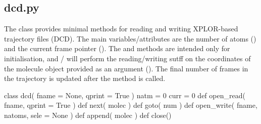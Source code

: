 \normalsize
\subsection[dcd]{dcd.py}
The class  provides
minimal methods for reading and writing XPLOR-based trajectory files (DCD). The main variables/attributes are
the number of atoms () and the current frame pointer ().
The  and  methods are intended
only for initialisation, and / will perform the reading/writing sutff on the coordinates
of the molecule object provided as an argument ().
The final number of frames in the trajectory is updated after the  method is called.\\
\begin{pyglist}[language=python,fvset={frame=single}]
class dcd( fname = None, qprint = True )
    natm = 0
	curr = 0
    def open_read( fname, qprint = True )
    def next( molec )
    def goto( num )
    def open_write( fname, natoms, sele = None )
    def append( molec )
    def close()
\end{pyglist}
